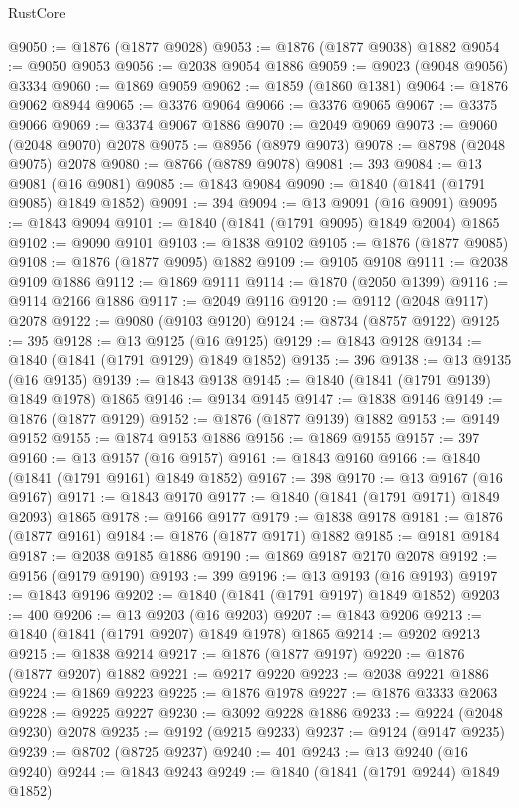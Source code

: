 \begin{lexlean}{RustCore}
\begin{coremodule}
@9050 := @1876 (@1877 @9028)
@9053 := @1876 (@1877 @9038) @1882
@9054 := @9050 @9053
@9056 := @2038 @9054 @1886
@9059 := @9023 (@9048 @9056) @3334
@9060 := @1869 @9059
@9062 := @1859 (@1860 @1381)
@9064 := @1876 @9062 @8944
@9065 := @3376 @9064
@9066 := @3376 @9065
@9067 := @3375 @9066
@9069 := @3374 @9067 @1886
@9070 := @2049 @9069
@9073 := @9060 (@2048 @9070) @2078
@9075 := @8956 (@8979 @9073)
@9078 := @8798 (@2048 @9075) @2078
@9080 := @8766 (@8789 @9078)
@9081 := 393
@9084 := @13 @9081 (@16 @9081)
@9085 := @1843 @9084
@9090 := @1840 (@1841 (@1791 @9085) @1849 @1852)
@9091 := 394
@9094 := @13 @9091 (@16 @9091)
@9095 := @1843 @9094
@9101 := @1840 (@1841 (@1791 @9095) @1849 @2004) @1865
@9102 := @9090 @9101
@9103 := @1838 @9102
@9105 := @1876 (@1877 @9085)
@9108 := @1876 (@1877 @9095) @1882
@9109 := @9105 @9108
@9111 := @2038 @9109 @1886
@9112 := @1869 @9111
@9114 := @1870 (@2050 @1399)
@9116 := @9114 @2166 @1886
@9117 := @2049 @9116
@9120 := @9112 (@2048 @9117) @2078
@9122 := @9080 (@9103 @9120)
@9124 := @8734 (@8757 @9122)
@9125 := 395
@9128 := @13 @9125 (@16 @9125)
@9129 := @1843 @9128
@9134 := @1840 (@1841 (@1791 @9129) @1849 @1852)
@9135 := 396
@9138 := @13 @9135 (@16 @9135)
@9139 := @1843 @9138
@9145 := @1840 (@1841 (@1791 @9139) @1849 @1978) @1865
@9146 := @9134 @9145
@9147 := @1838 @9146
@9149 := @1876 (@1877 @9129)
@9152 := @1876 (@1877 @9139) @1882
@9153 := @9149 @9152
@9155 := @1874 @9153 @1886
@9156 := @1869 @9155
@9157 := 397
@9160 := @13 @9157 (@16 @9157)
@9161 := @1843 @9160
@9166 := @1840 (@1841 (@1791 @9161) @1849 @1852)
@9167 := 398
@9170 := @13 @9167 (@16 @9167)
@9171 := @1843 @9170
@9177 := @1840 (@1841 (@1791 @9171) @1849 @2093) @1865
@9178 := @9166 @9177
@9179 := @1838 @9178
@9181 := @1876 (@1877 @9161)
@9184 := @1876 (@1877 @9171) @1882
@9185 := @9181 @9184
@9187 := @2038 @9185 @1886
@9190 := @1869 @9187 @2170 @2078
@9192 := @9156 (@9179 @9190)
@9193 := 399
@9196 := @13 @9193 (@16 @9193)
@9197 := @1843 @9196
@9202 := @1840 (@1841 (@1791 @9197) @1849 @1852)
@9203 := 400
@9206 := @13 @9203 (@16 @9203)
@9207 := @1843 @9206
@9213 := @1840 (@1841 (@1791 @9207) @1849 @1978) @1865
@9214 := @9202 @9213
@9215 := @1838 @9214
@9217 := @1876 (@1877 @9197)
@9220 := @1876 (@1877 @9207) @1882
@9221 := @9217 @9220
@9223 := @2038 @9221 @1886
@9224 := @1869 @9223
@9225 := @1876 @1978
@9227 := @1876 @3333 @2063
@9228 := @9225 @9227
@9230 := @3092 @9228 @1886
@9233 := @9224 (@2048 @9230) @2078
@9235 := @9192 (@9215 @9233)
@9237 := @9124 (@9147 @9235)
@9239 := @8702 (@8725 @9237)
@9240 := 401
@9243 := @13 @9240 (@16 @9240)
@9244 := @1843 @9243
@9249 := @1840 (@1841 (@1791 @9244) @1849 @1852)

\end{coremodule}
\end{lexlean}
